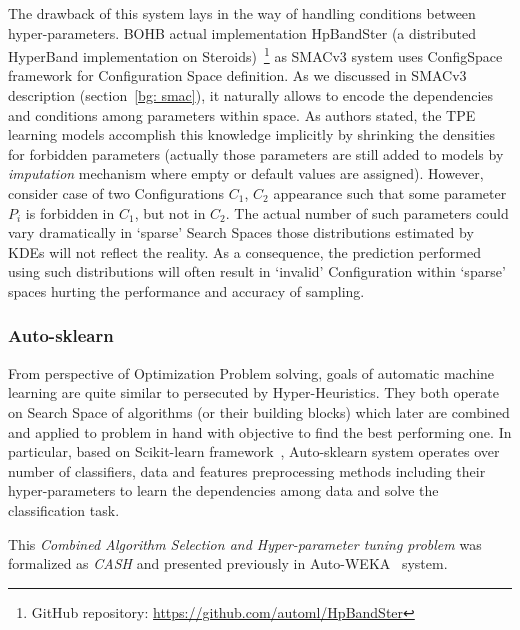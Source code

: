 The drawback of this system lays in the way of handling conditions between hyper-parameters. BOHB actual implementation HpBandSter (a distributed HyperBand implementation on Steroids)~\footnote{GitHub repository: \url{https://github.com/automl/HpBandSter}} as SMACv3 system uses ConfigSpace framework for Configuration Space definition. As we discussed in SMACv3 description (section~\ref{bg: smac}), it naturally allows to encode the dependencies and conditions among parameters within space. As authors stated, the TPE learning models accomplish this knowledge implicitly by shrinking the densities for forbidden parameters (actually those parameters are still added to models by \textit{imputation} mechanism where empty or default values are assigned). 
However, consider case of two Configurations $C_1$, $C_2$ appearance such that some parameter $P_i$ is forbidden in $C_1$, but not in $C_2$. The actual number of such parameters could vary dramatically in `sparse' Search Spaces those distributions estimated by KDEs will not reflect the reality. As a consequence, the prediction performed using such distributions will often result in `invalid' Configuration within `sparse' spaces hurting the performance and accuracy of sampling.



\subsubsection{Auto-sklearn~\cite{feurer2015efficient}}
From perspective of Optimization Problem solving, goals of automatic machine learning are quite similar to persecuted by Hyper-Heuristics. 
They both operate on Search Space of algorithms (or their building blocks) which later are combined and applied to problem in hand with objective to find the best performing one. In particular, based on Scikit-learn framework~\cite{scikit-learn}, Auto-sklearn system operates over number of classifiers, data and features preprocessing methods including their hyper-parameters to learn the dependencies among data and solve the classification task. %

This \textit{Combined Algorithm Selection and Hyper-parameter tuning problem} was formalized as \textit{CASH} and presented previously in Auto-WEKA~\cite{thornton2013auto} system.

